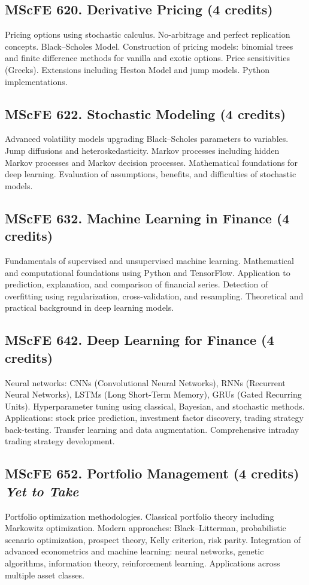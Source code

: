 \documentclass[11pt]{article}
\newcommand{\coursestatus}[1]{\hfill\normalsize\normalfont\textit{#1}}
\begin{document}
\subsection{MScFE 620. Derivative Pricing \mdseries(4 credits)}
Pricing options using stochastic calculus. No-arbitrage and perfect replication concepts. Black--Scholes Model. Construction of pricing models: binomial trees and finite difference methods for vanilla and exotic options. Price sensitivities (Greeks). Extensions including Heston Model and jump models. Python implementations.

\subsection{MScFE 622. Stochastic Modeling \mdseries(4 credits)}
Advanced volatility models upgrading Black--Scholes parameters to variables. Jump diffusions and heteroskedasticity. Markov processes including hidden Markov processes and Markov decision processes. Mathematical foundations for deep learning. Evaluation of assumptions, benefits, and difficulties of stochastic models.

\subsection{MScFE 632. Machine Learning in Finance \mdseries(4 credits)}
Fundamentals of supervised and unsupervised machine learning. Mathematical and computational foundations using Python and TensorFlow. Application to prediction, explanation, and comparison of financial series. Detection of overfitting using regularization, cross-validation, and resampling. Theoretical and practical background in deep learning models.

\subsection{MScFE 642. Deep Learning for Finance \mdseries(4 credits)}
Neural networks: CNNs (Convolutional Neural Networks), RNNs (Recurrent Neural Networks), LSTMs (Long Short-Term Memory), GRUs (Gated Recurring Units). Hyperparameter tuning using classical, Bayesian, and stochastic methods. Applications: stock price prediction, investment factor discovery, trading strategy back-testing. Transfer learning and data augmentation. Comprehensive intraday trading strategy development.

\subsection{MScFE 652. Portfolio Management \mdseries(4 credits) \coursestatus{Yet to Take}}
Portfolio optimization methodologies. Classical portfolio theory including Markowitz optimization. Modern approaches: Black--Litterman, probabilistic scenario optimization, prospect theory, Kelly criterion, risk parity. Integration of advanced econometrics and machine learning: neural networks, genetic algorithms, information theory, reinforcement learning. Applications across multiple asset classes.
\end{document}
